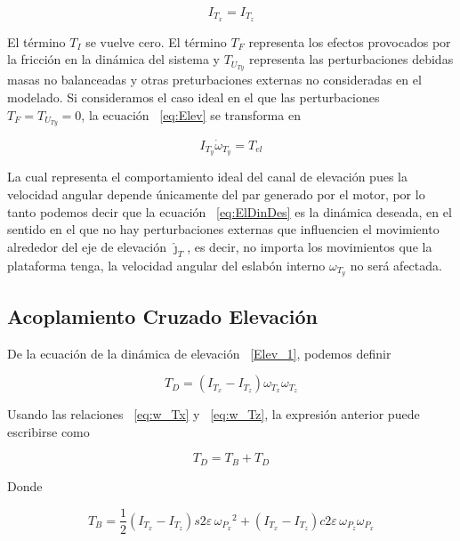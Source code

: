\begin{equation}
I_{T_x} = I_{T_z}
\label{eq:SimCond}
\end{equation}

El t\'{e}rmino $T_I$ se vuelve cero. El t\'{e}rmino $T_F$ representa los efectos provocados por la fricci\'{o}n en la din\'{a}mica del sistema y $T_{U_{Ty}}$ representa las perturbaciones debidas masas no balanceadas y otras preturbaciones externas no consideradas en el modelado. Si consideramos el caso ideal en el que las perturbaciones $T_F = T_{U_{Ty}} =0$, la ecuaci\'{o}n ~\ref{eq:Elev} se transforma en   

\begin{equation}
I_{T_y}\dot{\omega}_{T_y} = T_{el}
\label{eq:ElDinDes}
\end{equation}

La cual representa el comportamiento ideal del canal de elevaci\'{o}n pues la velocidad angular depende \'{u}nicamente del par generado por el motor, por lo tanto podemos decir que la ecuaci\'{o}n ~\ref{eq:ElDinDes} es la din\'{a}mica deseada, en el sentido en el que no hay perturbaciones externas que influencien el movimiento alrededor del eje de elevaci\'{o}n $\hat{\jmath}_T$, es decir, no importa los movimientos que la plataforma tenga, la velocidad angular del eslab\'{o}n interno $\omega_{T_y}$ no ser\'{a} afectada.    

\subsection{Acoplamiento Cruzado Elevaci\'{o}n}

De la ecuaci\'{o}n de la din\'{a}mica de elevaci\'{o}n ~\ref{Elev_1}, podemos definir

\begin{equation}
T_D=\left(I_{T_x}-I_{T_z}\right)\omega _{T_x}\omega _{T_z}
\end{equation}

Usando las relaciones ~\ref{eq:w_Tx} y ~\ref{eq:w_Tz}, la expresi\'{o}n anterior puede escribirse como

\begin{equation}
T_D=T_B+T_D
\end{equation}

Donde

\begin{equation}
T_B=\frac{1}{2}\left(I_{T_x}-I_{T_z}\right)s2\varepsilon \, {\omega _{P_x}}^2 + \left(I_{T_x}-I_{T_z}\right) c2\varepsilon \, \omega _{P_z}\omega _{P_x}
\end{equation}

